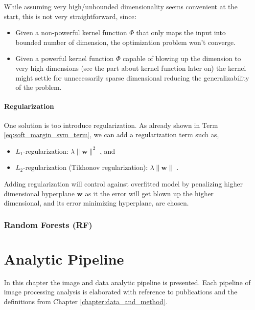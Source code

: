 \documentclass[pdftex,12pt,a4paper]{report}
\begin{document}
While assuming very high/unbounded dimensionality seems convenient at the start, this is not very straightforward, since:

\begin{itemize}
\item Given a non-powerful kernel function $\Phi$ that only maps the input into bounded number of dimension, the optimization problem won't converge.
\item Given a powerful kernel function $\Phi$ capable of blowing up the dimension to very high dimensions (see the part about kernel function later on) the kernel might settle for unnecessarily sparse dimensional reducing the generalizability of the problem.
\end{itemize}

\subsubsection*{Regularization}

One solution is too introduce regularization. As already shown in Term \ref{eq:soft_margin_svm_term}, we can add a regularization term such as, 

\begin{itemize}
\item $L_1$-regularization: $\lambda \| \mathbf{w} \|^2$ \cite{park2007l1}, and
\item $L_2$-regularization (Tikhonov regularization): $\lambda \| \mathbf{w} \|$ \cite{tikhonov1977solutions}.
\end{itemize}

Adding regularization will control against overfitted model by penalizing higher dimensional hyperplane $\mathbf{w}$ as it the error will get blown up the higher dimensional, and its error minimizing hyperplane, are chosen.

\subsection{Random Forests (RF)}
\label{subsection:rf}

\chapter{Analytic Pipeline}


In this chapter the image and data analytic pipeline is presented. Each pipeline of image processing analysis is elaborated with reference to publications and the definitions from Chapter \ref{chapter:data_and_method}.
\end{document}
